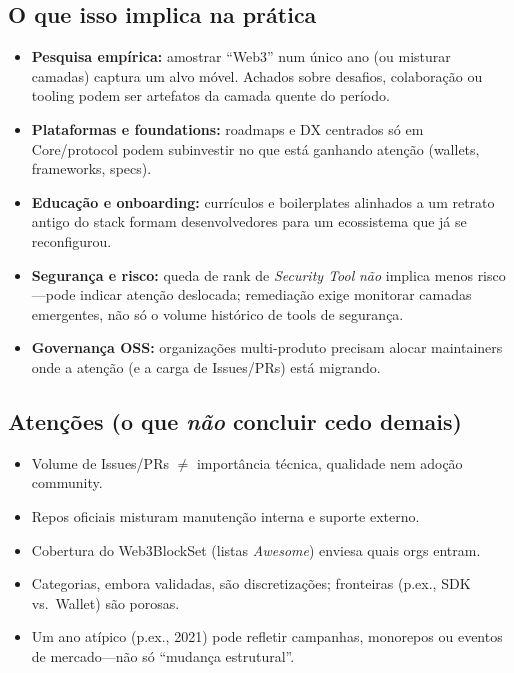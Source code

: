 \documentclass[10pt,conference]{IEEEtran}
\begin{document}
\subsection{O que isso implica na prática}
\begin{itemize}
\item \textbf{Pesquisa empírica:} amostrar ``Web3'' num único ano (ou misturar camadas) captura um alvo móvel. Achados sobre desafios, colaboração ou tooling podem ser artefatos da camada quente do período.
\item \textbf{Plataformas e foundations:} roadmaps e DX centrados só em Core/protocol podem subinvestir no que está ganhando atenção (wallets, frameworks, specs).
\item \textbf{Educação e onboarding:} currículos e boilerplates alinhados a um retrato antigo do stack formam desenvolvedores para um ecossistema que já se reconfigurou.
\item \textbf{Segurança e risco:} queda de rank de \emph{Security Tool} \emph{não} implica menos risco---pode indicar atenção deslocada; remediação exige monitorar camadas emergentes, não só o volume histórico de tools de segurança.
\item \textbf{Governança OSS:} organizações multi-produto precisam alocar maintainers onde a atenção (e a carga de Issues/PRs) está migrando.
\end{itemize}

\subsection{Atenções (o que \emph{não} concluir cedo demais)}
\begin{itemize}
\item Volume de Issues/PRs $\neq$ importância técnica, qualidade nem adoção community.
\item Repos oficiais misturam manutenção interna e suporte externo.
\item Cobertura do Web3BlockSet (listas \emph{Awesome}) enviesa quais orgs entram.
\item Categorias, embora validadas, são discretizações; fronteiras (p.ex., SDK vs.\ Wallet) são porosas.
\item Um ano atípico (p.ex., 2021) pode refletir campanhas, monorepos ou eventos de mercado---não só ``mudança estrutural''.
\end{itemize}
\end{document}

